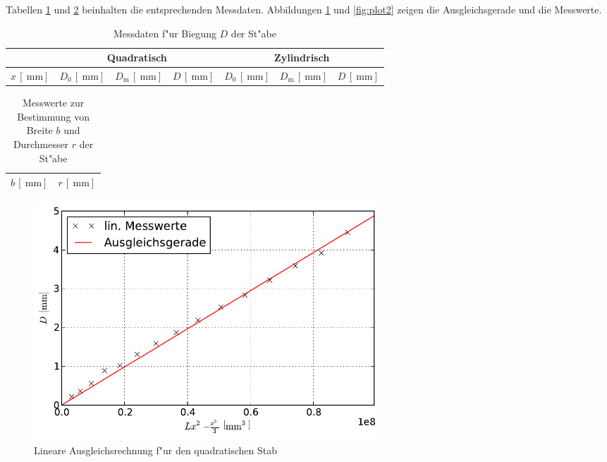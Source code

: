 		Tabellen \ref{table:messung1} und \ref{table:ausmasse1} beinhalten die entsprechenden Messdaten.
		Abbildungen \ref{fig:plot1} und \ref{fig:plot2} zeigen die Ausgleichsgerade und die Messwerte.

		\begin{table}[h!]
			\begin{center}
				\caption{Messdaten f"ur Biegung $D$ der St"abe \label{table:messung1}}
				\begin{tabular}{|r|r|r|r|r|r|r|}
					\hline
						\multicolumn{1}{|c|}{} &
						\multicolumn{3}{c|}{Quadratisch} &
						\multicolumn{3}{c|}{Zylindrisch} \\
					\hline
						\multicolumn{1}{|c|}{$x\,[\SI{}{\milli \meter}]$} &  
						\multicolumn{1}{c|}{$D_0\,[\SI{}{\milli \meter}]$} &  
						\multicolumn{1}{c|}{$D_\mathrm{m}\,[\SI{}{\milli \meter}]$} &  
						\multicolumn{1}{c|}{$D\,[\SI{}{\milli \meter}]$} &  
						\multicolumn{1}{c|}{$D_0\,[\SI{}{\milli \meter}]$} &  
						\multicolumn{1}{c|}{$D_\mathrm{m}\,[\SI{}{\milli \meter}]$} &  
						\multicolumn{1}{c|}{$D\,[\SI{}{\milli \meter}]$} \\
					\hline 
					\hline
						
					\hline 
				\end{tabular}
			\end{center}
		\end{table}

		\begin{table}[h!]
			\begin{center}
				\caption{Messwerte zur Bestimmung von Breite $b$ und Durchmesser $r$ der St"abe \label{table:ausmasse1}}
				\begin{tabular}{|r|r||r|r|}
					\hline
						\multicolumn{2}{|c|}{$b\,[\SI{}{\milli \meter}]$} & \multicolumn{2}{c|}{$r\,[\SI{}{\milli \meter}]$} \\
					\hline 
					\hline
						
					\hline 
				\end{tabular}
			\end{center}
		\end{table}

		\begin{figure}[h]
			\centering
			\includegraphics[width = 13cm]{img/plot1.pdf}
			\caption{Lineare Ausgleichsrechnung f"ur den quadratischen Stab \label{fig:plot1}}
		\end{figure}

